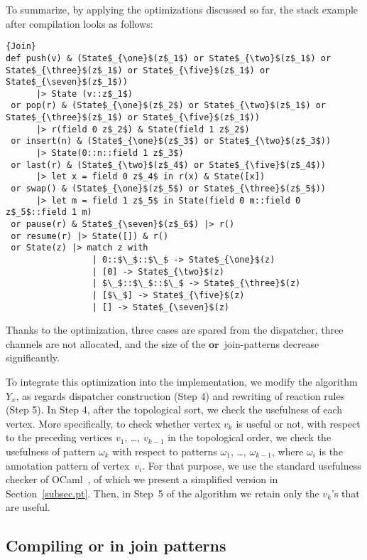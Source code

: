 \documentclass{LMCS}
\newcommand{\ptbis}{\omega}
\newcommand{\ocaml}{\textrm{OCaml}\xspace}
\newcommand{\kwd}[1]{\ensuremath{\mathbf{#1}}}
\renewcommand{\_}{\mathord{\rule[-.25ex]{1ex}{.15ex}}}
\begin{document}
To summarize, by applying the optimizations discussed so far, the
stack example after compilation looks as follows:
\begin{lstlisting}{Join}
def push(v) & (State$_{\one}$(z$_1$) or State$_{\two}$(z$_1$) or State$_{\three}$(z$_1$) or State$_{\five}$(z$_1$) or State$_{\seven}$(z$_1$))
      |> State (v::z$_1$) 
 or pop(r) & (State$_{\one}$(z$_2$) or State$_{\two}$(z$_1$) or State$_{\three}$(z$_1$) or State$_{\five}$(z$_1$))
      |> r(field 0 z$_2$) & State(field 1 z$_2$)
 or insert(n) & (State$_{\one}$(z$_3$) or State$_{\two}$(z$_3$))
      |> State(0::n::field 1 z$_3$)
 or last(r) & (State$_{\two}$(z$_4$) or State$_{\five}$(z$_4$))
      |> let x = field 0 z$_4$ in r(x) & State([x])
 or swap() & (State$_{\one}$(z$_5$) or State$_{\three}$(z$_5$))
      |> let m = field 1 z$_5$ in State(field 0 m::field 0 z$_5$::field 1 m)
 or pause(r) & State$_{\seven}$(z$_6$) |> r()
 or resume(r) |> State([]) & r()
 or State(z) |> match z with
                 | 0::$\_$::$\_$ -> State$_{\one}$(z)
                 | [0] -> State$_{\two}$(z)
                 | $\_$::$\_$::$\_$ -> State$_{\three}$(z)
                 | [$\_$] -> State$_{\five}$(z)
                 | [] -> State$_{\seven}$(z)
\end{lstlisting}
Thanks to the optimization, three cases are spared from the
dispatcher, three channels are not allocated, and the size of the
$\kwd{or}$~join-patterns decrease significantly.

To integrate this optimization into the implementation, we modify the
algorithm $Y_x$, as regards dispatcher construction (Step 4) and
rewriting of reaction rules (Step 5). In Step 4, after the topological
sort, we check the usefulness of each vertex.  More specifically, to
check whether vertex $v_k$ is useful or not, with respect to the
preceding vertices $v_1$, \ldots{}, $v_{k-1}$ in the topological
order, we check the usefulness of pattern $\ptbis_k$ with respect to
patterns $\ptbis_1$, \ldots{}, $\ptbis_{k-1}$, where $\ptbis_i$ is the
annotation pattern of vertex~$v_i$. For that purpose, we use the
standard usefulness checker of \ocaml~\cite{warning}, of which we
present a simplified version in Section~\ref{subsec.pt}.  Then, in
Step~5 of the algorithm we retain only the $v_k$'s that are useful.

\subsection{Compiling \textbf{or} in join patterns}
\label{subsec.share}
\end{document}
